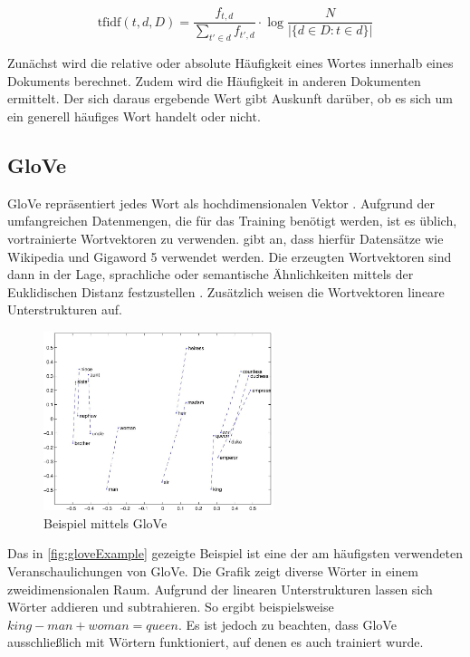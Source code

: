 \[\mathrm{tfidf}(t,d,D) = \frac{f_{t,d}}{{\sum_{t' \in d}{f_{t',d}}}} \cdot \log \frac{N}{|\{d \in D: t \in d\}|}\]

Zunächst wird die relative oder absolute Häufigkeit eines Wortes innerhalb eines Dokuments berechnet. Zudem wird die Häufigkeit in anderen Dokumenten ermittelt. Der sich daraus ergebende Wert gibt Auskunft darüber, ob es sich um ein generell häufiges Wort handelt oder nicht.

\subsection*{GloVe}

\ac{GloVe} repräsentiert jedes Wort als hochdimensionalen Vektor \autocite[8\psq]{kowsari_text_2019}. Aufgrund der umfangreichen Datenmengen, die für das Training benötigt werden, ist es üblich, vortrainierte Wortvektoren zu verwenden. \citeauthor{kowsari_text_2019} gibt an, dass hierfür Datensätze wie Wikipedia und Gigaword \num{5} verwendet werden. Die erzeugten Wortvektoren sind dann in der Lage, sprachliche oder semantische Ähnlichkeiten mittels der Euklidischen Distanz festzustellen \autocite{pennington_glove_2014}. Zusätzlich weisen die Wortvektoren lineare Unterstrukturen auf.

\begin{figure}[H]
  \centering
  \includegraphics[width=0.6\textwidth]{data/images/materials_and_methods/man_woman.jpg}
  \caption{Beispiel \autocite{Mann - Frau} mittels \acs{GloVe} \autocite{pennington_glove_2014}} \label{fig:gloveExample}
\end{figure}

Das in \autoref{fig:gloveExample} gezeigte Beispiel ist eine der am häufigsten verwendeten Veranschaulichungen von \ac{GloVe}. Die Grafik zeigt diverse Wörter in einem zweidimensionalen Raum. Aufgrund der linearen Unterstrukturen lassen sich Wörter addieren und subtrahieren. So ergibt beispielsweise \(king - man + woman = queen\). Es ist jedoch zu beachten, dass \ac{GloVe} ausschließlich mit Wörtern funktioniert, auf denen es auch trainiert wurde.

